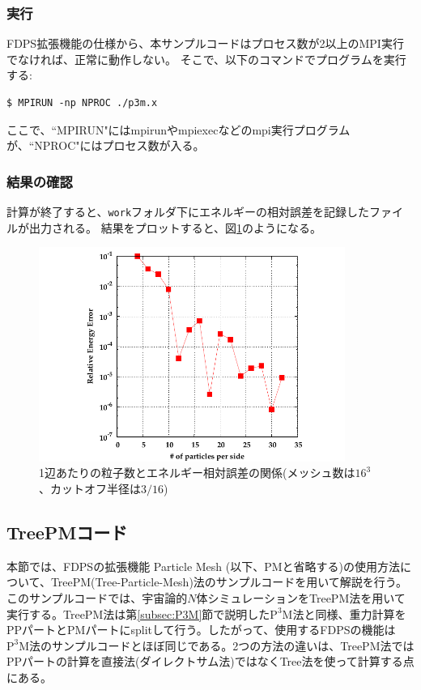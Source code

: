 \subsubsection{実行}
FDPS拡張機能の仕様から、本サンプルコードはプロセス数が2以上のMPI実行でなければ、正常に動作しない。
そこで、以下のコマンドでプログラムを実行する:
\begin{screen}
\begin{verbatim}
$ MPIRUN -np NPROC ./p3m.x
\end{verbatim}
\end{screen}
ここで、``MPIRUN"にはmpirunやmpiexecなどのmpi実行プログラムが、``NPROC"にはプロセス数が入る。

\subsubsection{結果の確認}
計算が終了すると、\texttt{work}フォルダ下にエネルギーの相対誤差を記録したファイルが出力される。
結果をプロットすると、図\ref{fig:p3m}のようになる。

\begin{figure}
\centering
\includegraphics[width=10cm]{fig/p3m.pdf}
\caption{1辺あたりの粒子数とエネルギー相対誤差の関係(メッシュ数は$16^{3}$、カットオフ半径は$3/16$)}
\label{fig:p3m}
\end{figure}
\clearpage

\ifCpp %
\subsection{TreePMコード} \label{subsec:TreePM}
本節では、FDPSの拡張機能 Particle Mesh (以下、PMと省略する)の使用方法について、TreePM(Tree-Particle-Mesh)法のサンプルコードを用いて解説を行う。このサンプルコードでは、宇宙論的$N$体シミュレーションをTreePM法を用いて実行する。TreePM法は第\ref{subsec:P3M}節で説明した$\mathrm{P^{3}M}$法と同様、重力計算をPPパートとPMパートにsplitして行う。したがって、使用するFDPSの機能は$\mathrm{P^{3}M}$法のサンプルコードとほぼ同じである。2つの方法の違いは、TreePM法ではPPパートの計算を直接法(ダイレクトサム法)ではなくTree法を使って計算する点にある。

